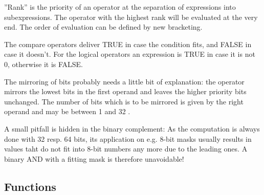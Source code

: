 \documentclass[12pt,twoside]{report}
\begin{document}
''Rank'' is the priority of an operator at the separation of expressions
into subexpressions.  The operator with the highest rank will be
evaluated at the very end.  The order of evaluation can be defined by
new bracketing.

The compare operators deliver TRUE in case the condition fits,
and FALSE in case it doesn't.  For the logical operators an expression
is TRUE in case it is not 0, otherwise it is FALSE.

The mirroring of bits probably needs a little bit of explanation: the
operator mirrors the lowest bits in the first operand and leaves the
higher priority bits unchanged.  The number of bits which is to be
mirrored is given by the right operand and may be between 1 and 32 .

A small pitfall is hidden in the binary complement: As the
computation is always done with 32 resp. 64 bits, its application on
e.g. 8-bit masks usually results in values taht do not fit into 8-bit
numbers any more due to the leading ones.  A binary AND with a
fitting mask is therefore unavoidable!

\subsection{Functions}
\end{document}
